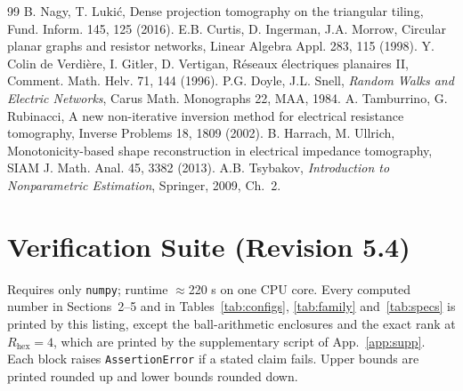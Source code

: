 \documentclass[11pt,a4paper]{article}
\theoremstyle{definition}
\theoremstyle{remark}
\begin{document}
\begin{thebibliography}{99}
 B. Nagy, T. Luki\'c, Dense projection tomography on the triangular tiling, Fund. Inform. 145, 125 (2016).
 E.B. Curtis, D. Ingerman, J.A. Morrow, Circular planar graphs and resistor networks, Linear Algebra Appl. 283, 115 (1998).
 Y. Colin de Verdi\`ere, I. Gitler, D. Vertigan, R\'eseaux \'electriques planaires II, Comment. Math. Helv. 71, 144 (1996).
 P.G. Doyle, J.L. Snell, \textit{Random Walks and Electric Networks}, Carus Math. Monographs 22, MAA, 1984.
 A. Tamburrino, G. Rubinacci, A new non-iterative inversion method for electrical resistance tomography, Inverse Problems 18, 1809 (2002).
 B. Harrach, M. Ullrich, Monotonicity-based shape reconstruction in electrical impedance tomography, SIAM J. Math. Anal. 45, 3382 (2013).
 A.B. Tsybakov, \textit{Introduction to Nonparametric Estimation}, Springer, 2009, Ch.~2.
\end{thebibliography}

\appendix
\section{Verification Suite (Revision 5.4)}\label{app:code}
Requires only \texttt{numpy}; runtime $\approx$220 s on one CPU core. Every computed number in Sections~2--5 and in Tables~\ref{tab:configs}, \ref{tab:family} and~\ref{tab:specs} is printed by this listing, except the ball-arithmetic enclosures and the exact rank at $R_{\text{hex}} = 4$, which are printed by the supplementary script of App.~\ref{app:supp}. Each block raises \texttt{AssertionError} if a stated claim fails. Upper bounds are printed rounded up and lower bounds rounded down.
\end{document}
